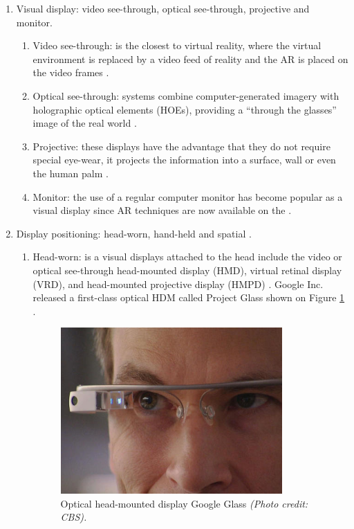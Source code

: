 \begin{enumerate}
  \item Visual display: video see-through, optical see-through, projective and monitor.
    \begin{enumerate}
      \item Video see-through: is the closest to virtual reality, where the virtual environment is replaced by a video feed of reality and the AR is placed on the video frames \cite{Benford1998}.
      \item Optical see-through: systems combine computer-generated imagery with holographic optical elements (HOEs), providing a ``through the glasses'' image of the real world \cite{Benford1998}.
      \item Projective: these displays have the advantage that they do not require special eye-wear, it projects the information into a surface, wall or even the human palm \cite{Benford1998}.
      \item Monitor: the use of a regular computer monitor has become popular as a visual display since AR techniques are now available on the \cite{Benford1998}.
    \end{enumerate}

  \item Display positioning: head-worn, hand-held and spatial \cite{Benford1998}.
    \begin{enumerate}
      \item Head-worn: is a visual displays attached to the head include the video or optical see-through head-mounted display (HMD), virtual retinal display (VRD), and head-mounted projective display (HMPD) \cite{Benford1998}. Google Inc. released a first-class optical HDM called Project Glass shown on Figure \ref{figure:google_glass} \cite{Glass2013}.

        \begin{figure}[!htb]
          \centering
          \includegraphics[width=240pt]{chapters/basic_concepts/google_glass.png}
          \caption{Optical head-mounted display Google Glass \cite{Glass2013} \textit{(Photo credit: CBS).}}
          \label{figure:google_glass}
        \end{figure}


\end{enumerate}
\end{enumerate}
